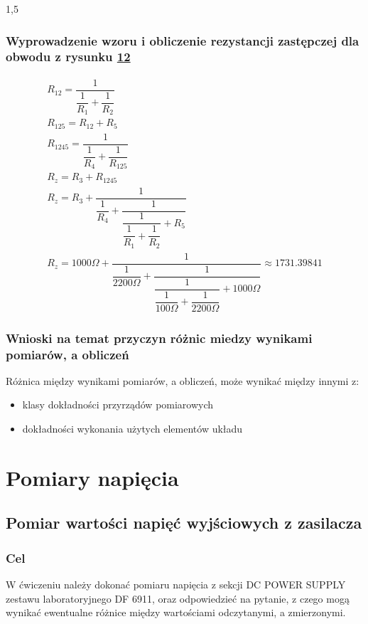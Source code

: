 \documentclass[polish,polish,a4paper]{article}
\begin{document}
\begin{spacing}{1,5}
		\subsubsection*{Wyprowadzenie wzoru i obliczenie rezystancji zastępczej  dla obwodu z rysunku \hyperref[eq:rys12]{12}}	
		\begin{gather*}
		R_{12} = \dfrac{1}{\dfrac{1}{R_{1}} + \dfrac{1}{R_{2}}}\\
		R_{125} = R_{12} + R_{5}\\
		R_{1245} = \dfrac{1}{\dfrac{1}{R_{4}} + \dfrac{1}{R_{125}}}\\
		R_{z} = R_{3} + R_{1245}\\
		R_{z} = R_{3}+ \dfrac{1}{\dfrac{1}{R_{4}} + \dfrac{1}{\dfrac{1}{\dfrac{1}{R_{1}} + \dfrac{1}{R_{2}}}+ R_{5}}}\\
		R_{z} = 1000\Omega+ \dfrac{1}{\dfrac{1}{2200\Omega} + \dfrac{1}{\dfrac{1}{\dfrac{1}{100\Omega} + \dfrac{1}{2200\Omega}}+ 1000\Omega}} \approx 1731.39841
		\end{gather*}
		
		\subsubsection*{Wnioski na temat przyczyn różnic miedzy wynikami pomiarów, a obliczeń}
		
		Różnica między wynikami pomiarów, a obliczeń, może wynikać między innymi z:
		\begin{itemize}
			\item klasy dokładności przyrządów pomiarowych
			\item dokładności wykonania użytych elementów układu
		\end{itemize}
		
		
		
		\section{Pomiary napięcia}
		\subsection{Pomiar wartości napięć wyjściowych z zasilacza}
		
		\subsubsection*{Cel}
		W ćwiczeniu należy dokonać pomiaru napięcia z sekcji DC POWER SUPPLY zestawu laboratoryjnego DF
		6911, oraz odpowiedzieć na pytanie, z czego mogą wynikać ewentualne różnice między wartościami odczytanymi, a zmierzonymi.
		

\end{spacing}
\end{document}
